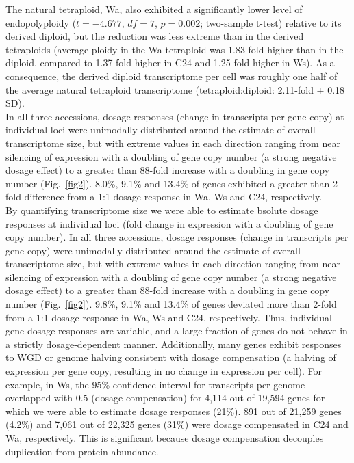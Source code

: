 \documentclass[11pt]{article}
\begin{document}
The natural tetraploid, Wa, also exhibited a significantly lower level of endopolyploidy ($t = -4.677$, $df = 7$, $p = 0.002$; two-sample t-test) relative to its derived diploid, but the reduction was less extreme than in the derived tetraploids (average ploidy in the Wa tetraploid was 1.83-fold higher than in the diploid, compared to 1.37-fold higher in C24 and 1.25-fold higher in Ws).
As a consequence, the derived diploid transcriptome per cell was roughly one half of the average natural tetraploid transcriptome (tetraploid:diploid: 2.11-fold $\pm$ 0.18 SD).\\

In all three accessions, dosage responses (change in transcripts per gene copy) at individual loci were unimodally distributed around the estimate of overall transcriptome size, but with extreme values in each direction ranging from near silencing of expression with a doubling of gene copy number (a strong negative dosage effect) to a greater than 88-fold increase with a doubling in gene copy number (Fig.~\ref{fig2}).
8.0\%, 9.1\% and 13.4\% of genes exhibited a greater than 2-fold difference from a 1:1 dosage response in Wa, Ws and C24, respectively.\\

By quantifying transcriptome size we were able to estimate bsolute dosage responses at individual loci (fold change in expression with a doubling of gene copy number). In all three accessions, dosage responses (change in transcripts per gene copy) were unimodally distributed around the estimate of overall transcriptome size, but with extreme values in each direction ranging from near silencing of expression with a doubling of gene copy number (a strong negative dosage effect) to a greater than 88-fold increase with a doubling in gene copy number (Fig.~\ref{fig2}). 9.8\%, 9.1\% and 13.4\% of genes deviated more than 2-fold from a 1:1 dosage response in Wa, Ws and C24, respectively. Thus, individual gene dosage responses are variable, and a large fraction of genes do not behave in a strictly dosage-dependent manner.  
Additionally, many genes exhibit responses to WGD or genome halving consistent with dosage compensation (a halving of expression per gene copy, resulting in no change in expression per cell). For example, in Ws, the 95\% confidence interval for transcripts per genome overlapped with 0.5 (dosage compensation) for 4,114 out of 19,594 genes for which we were able to estimate dosage responses (21\%). 891 out of 21,259 genes (4.2\%) and 7,061 out of 22,325 genes (31\%) were dosage compensated in C24 and Wa, respectively. This is significant because dosage compensation decouples duplication from protein abundance.
	
\end{document}
